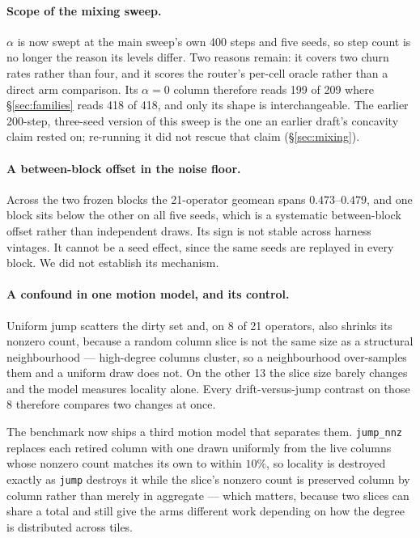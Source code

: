\documentclass{article}
\begin{document}
\paragraph{Scope of the mixing sweep.} $\alpha$ is now swept at the main
sweep's own 400 steps and five seeds, so step count is no longer the reason its
levels differ. Two reasons remain: it covers two churn rates rather than four,
and it scores the router's per-cell oracle rather than a direct arm comparison.
Its $\alpha{=}0$ column therefore reads 199 of 209 where \S\ref{sec:families}
reads 418 of 418, and only its shape is interchangeable. The earlier 200-step,
three-seed version of this sweep is the one an earlier draft's concavity claim
rested on; re-running it did not rescue that claim (\S\ref{sec:mixing}).

\paragraph{A between-block offset in the noise floor.} Across the two frozen
blocks the 21-operator geomean spans $0.473$--$0.479$, and one block sits below
the other on all five seeds, which is a systematic between-block offset rather
than independent draws. Its sign is not stable across harness vintages. It
cannot be a seed effect, since the same seeds are replayed in every block. We
did not establish its mechanism.

\paragraph{A confound in one motion model, and its control.} Uniform jump
scatters the dirty set and, on 8 of 21 operators, also shrinks its nonzero count,
because a random column slice is not the same size as a structural neighbourhood
--- high-degree columns cluster, so a neighbourhood over-samples them and a
uniform draw does not. On the other 13 the slice size barely changes and the
model measures locality alone. Every drift-versus-jump contrast on those 8
therefore compares two changes at once.

The benchmark now ships a third motion model that separates them.
\texttt{jump\_nnz} replaces each retired column with one drawn uniformly from the
live columns whose nonzero count matches its own to within $10\%$, so locality is
destroyed exactly as \texttt{jump} destroys it while the slice's nonzero count is
preserved column by column rather than merely in aggregate --- which matters,
because two slices can share a total and still give the arms different work
depending on how the degree is distributed across tiles.
\end{document}
